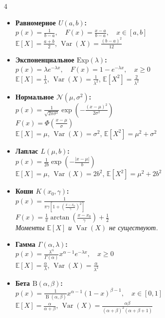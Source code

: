 \documentclass[a4paper, landscape]{article}
\newcommand{\E}{\mathbb{E}}
\DeclareMathOperator{\Var}{Var}
\newcommand{\PhiFunc}{\Phi} %
\begin{document}
\begin{multicols*}{4}
\begin{itemize}[leftmargin=*, nosep, itemsep=5pt]
    \item \textbf{Равномерное $U(a,b)$:} \\
    $p(x) = \frac{1}{b-a}, \quad F(x) = \frac{x-a}{b-a}, \quad x \in [a, b]$ \\
    $\E[X] = \frac{a+b}{2}$, \quad $\Var(X) = \frac{(b-a)^2}{12}$

    \item \textbf{Экспоненциальное $\text{Exp}(\lambda)$:} \\
    $p(x) = \lambda e^{-\lambda x}, \quad F(x) = 1 - e^{-\lambda x}, \quad x \ge 0$ \\
    $\E[X] = \frac{1}{\lambda}$, \quad $\Var(X) = \frac{1}{\lambda^2}$, \quad $\E[X^2] = \frac{2}{\lambda^2}$

    \item \textbf{Нормальное $\mathcal{N}(\mu, \sigma^2)$:} \\
    $p(x) = \frac{1}{\sqrt{2\pi\sigma^2}} \exp\left(-\frac{(x-\mu)^2}{2\sigma^2}\right)$ \\
    $F(x) = \PhiFunc\left(\frac{x-\mu}{\sigma}\right)$ \\
    $\E[X] = \mu$, \quad $\Var(X) = \sigma^2$, \quad $\E[X^2] = \mu^2 + \sigma^2$

    \item \textbf{Лаплас $L(\mu, b)$:} \\
    $p(x) = \frac{1}{2b} \exp\left(-\frac{|x-\mu|}{b}\right)$ \\
    $\E[X] = \mu$, \quad $\Var(X) = 2b^2$, \quad $\E[X^2] = \mu^2 + 2b^2$

    \item \textbf{Коши $K(x_0, \gamma)$:} \\
    $p(x) = \frac{1}{\pi\gamma \left[1 + \left(\frac{x-x_0}{\gamma}\right)^2\right]}$ \\
    $F(x) = \frac{1}{\pi} \arctan\left(\frac{x-x_0}{\gamma}\right) + \frac{1}{2}$ \\
    \textit{Моменты $\E[X]$ и $\Var(X)$ не существуют.}

    \item \textbf{Гамма $\Gamma(\alpha, \lambda)$:} \\
    $p(x) = \frac{\lambda^\alpha}{\Gamma(\alpha)} x^{\alpha-1} e^{-\lambda x}, \quad x \ge 0$ \\
    $\E[X] = \frac{\alpha}{\lambda}$, \quad $\Var(X) = \frac{\alpha}{\lambda^2}$

    \item \textbf{Бета $\text{B}(\alpha, \beta)$:} \\
    $p(x) = \frac{1}{\operatorname{B}(\alpha, \beta)} x^{\alpha-1} (1-x)^{\beta-1}, \quad x \in [0,1]$ \\
    $\E[X] = \frac{\alpha}{\alpha+\beta}$, \quad $\Var(X) = \frac{\alpha\beta}{(\alpha+\beta)^2(\alpha+\beta+1)}$


\end{itemize}
\end{multicols*}
\end{document}
